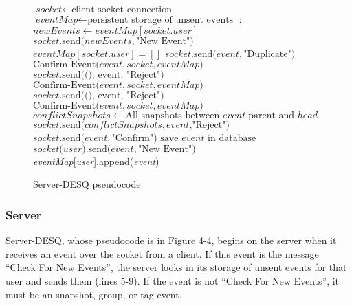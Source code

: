 \begin{center}
\begin{figure}[h]
\begin{algorithmic}[1]
\State $\textit{socket} \gets \text{client socket connection}$
\State $\textit{eventMap} \gets \text{persistent storage of unsent events}$
:
\State $newEvents \gets eventMap[socket.user]$
\State $socket\text{.send(}newEvents, \text{"New Event")}$
\State $eventMap[socket.user] = []$
\EndIf
{}
\State $socket\text{.send(}event, \text{"Duplicate")}$
\State $\text{Confirm-Event(}event, socket, eventMap\text{)}$
\Else 
\State $socket\text{.send((), event, "Reject")}$
\EndIf
{}
\State $\text{Confirm-Event(}event, socket, eventMap\text{)}$
\Else 
\State $socket\text{.send((), event, "Reject")}$ 
\EndIf
\Else {}
\State $\text{Confirm-Event(}event, socket, eventMap\text{)}$
\Else
\State $conflictSnapshots \gets \text{All snapshots between }event\text{.parent and }head$
\State $socket\text{.send(}conflictSnapshots, event\text{,"Reject")}$
\EndIf
\EndIf
\EndWhile
\EndProcedure
{}
\State $socket\text{.send(}event, \text{"Confirm")}$
\State $\text{save }event\text{ in database}$
\State $socket\text{(}user\text{).send(}event, \text{"New Event")}$
\Else
\State \emph{eventMap}[\emph{user}].append(\emph{event})
\EndIf
\EndFor
\EndProcedure
\end{algorithmic}
\caption{Server-DESQ pseudocode}\label{euclid}
\end{figure}
\end{center}

\subsubsection{Server}

Server-DESQ, whose pseudocode is in Figure 4-4, begins on the server when it receives an event over the socket from a client. If this event is the message ``Check For New Events'', the server looks in its storage of unsent events for that user and sends them (lines 5-9). If the event is not ``Check For New Events'', it must be an snapshot, group, or tag event.

